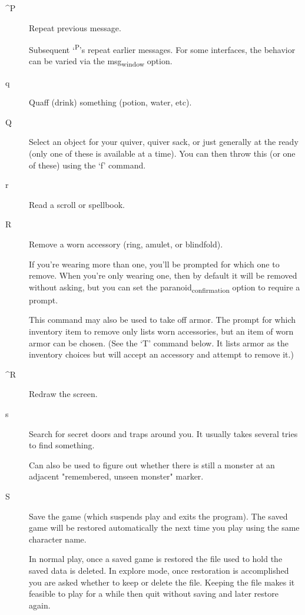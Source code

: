 \documentclass[11pt]{article}
\begin{document}
\begin{description}
\item[{\^{}P}] Repeat previous message.

Subsequent `\textsuperscript{P}'s repeat earlier messages. For some interfaces, the
behavior can be varied via the msg\textsubscript{window} option.

\item[{q}] Quaff (drink) something (potion, water, etc).

\item[{Q}] Select an object for your quiver, quiver sack, or just
generally at the ready (only one of these is available at a time).
You can then throw this (or one of these) using the `f' command.

\item[{r}] Read a scroll or spellbook.

\item[{R}] Remove a worn accessory (ring, amulet, or blindfold).

If you're wearing more than one, you'll be prompted for which one to
 remove. When you're only wearing one, then by default it will be
 removed without asking, but you can set the paranoid\textsubscript{confirmation}
 option to require a prompt. 

This command may also be used to take off armor. The prompt for
which inventory item to remove only lists worn accessories, but an
item of worn armor can be chosen.  (See the `T' command below. It
lists armor as the inventory choices but will accept an accessory
and attempt to remove it.)

\item[{\^{}R}] Redraw the screen.

\item[{s}] Search for secret doors and traps around you.  It usually takes
several tries to find something. 

Can also be used to figure out whether there is still a monster at an
 adjacent "remembered, unseen monster" marker.

\item[{S}] Save the game (which suspends play and exits the program). The
saved game will be restored automatically the next time you play
using the same character name. 

In normal play, once a saved game is restored the file used to hold
 the saved data is deleted. In explore mode, once restoration is
 accomplished you are asked whether to keep or delete the
 file. Keeping the file makes it feasible to play for a while then
 quit without saving and later restore again.  


\end{description}
\end{document}
